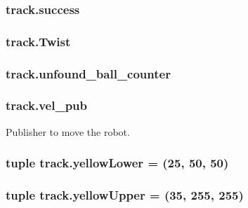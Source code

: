 \subsubsection[{\texorpdfstring{success}{success}}]{\setlength{\rightskip}{0pt plus 5cm}track.\+success}\hypertarget{namespacetrack_a368c0796cb0ee26a2f62cda3c828267f}{}\label{namespacetrack_a368c0796cb0ee26a2f62cda3c828267f}
\subsubsection[{\texorpdfstring{Twist}{Twist}}]{\setlength{\rightskip}{0pt plus 5cm}track.\+Twist}\hypertarget{namespacetrack_a5c72c6ba52347132ee923f404620079a}{}\label{namespacetrack_a5c72c6ba52347132ee923f404620079a}
\subsubsection[{\texorpdfstring{unfound\+\_\+ball\+\_\+counter}{unfound_ball_counter}}]{\setlength{\rightskip}{0pt plus 5cm}track.\+unfound\+\_\+ball\+\_\+counter}\hypertarget{namespacetrack_a571b301da76cd6ce19cecf7aeb902f5f}{}\label{namespacetrack_a571b301da76cd6ce19cecf7aeb902f5f}
\subsubsection[{\texorpdfstring{vel\+\_\+pub}{vel_pub}}]{\setlength{\rightskip}{0pt plus 5cm}track.\+vel\+\_\+pub}\hypertarget{namespacetrack_a2f8cfd339cb658bb3d8f142eef1dbaeb}{}\label{namespacetrack_a2f8cfd339cb658bb3d8f142eef1dbaeb}


Publisher to move the robot. 

\subsubsection[{\texorpdfstring{yellow\+Lower}{yellowLower}}]{\setlength{\rightskip}{0pt plus 5cm}tuple track.\+yellow\+Lower = (25, 50, 50)}\hypertarget{namespacetrack_a29d421bd8aa932d14a9cbf7779bba62b}{}\label{namespacetrack_a29d421bd8aa932d14a9cbf7779bba62b}
\subsubsection[{\texorpdfstring{yellow\+Upper}{yellowUpper}}]{\setlength{\rightskip}{0pt plus 5cm}tuple track.\+yellow\+Upper = (35, 255, 255)}\hypertarget{namespacetrack_a2071c6a41ecce68b84c956b0c5f8219a}{}\label{namespacetrack_a2071c6a41ecce68b84c956b0c5f8219a}
